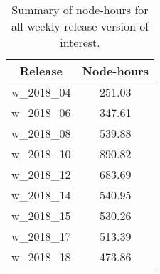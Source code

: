 \begin{table}[h]
  \centering
  \begin{tabular} {|c|c|}
    \hline
    Release & Node-hours \\
    \hline
    w\_2018\_04 & 251.03 \\
    w\_2018\_06 & 347.61 \\
    w\_2018\_08 & 539.88 \\
    w\_2018\_10 & 890.82 \\
    w\_2018\_12 & 683.69 \\
    w\_2018\_14 & 540.95 \\
    w\_2018\_15 & 530.26 \\
    w\_2018\_17 & 513.39 \\
    w\_2018\_18 & 473.86 \\
    \hline
  \end{tabular}
  \caption{Summary of node-hours for all weekly release version of interest.}
  \label{SummaryTable}
\end{table}
